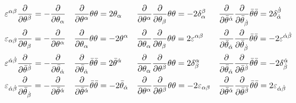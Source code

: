 \documentclass[CheatSheet]{subfiles}
\begin{document}
\begin{align*}
&
\varepsilon^{\alpha\beta}\frac{\partial}{\partial\theta^\beta}=-\frac{\partial}{\partial\theta_\alpha}
&&
\frac{\partial}{\partial \theta^{\alpha}}\theta \theta =2 \theta_{\alpha}
&&
\frac{\partial}{\partial \theta^{\alpha}}\frac{\partial}{\partial \theta_{\beta}}\theta \theta =-2 \delta^{\beta}_{\alpha}
&&
\frac{\partial}{\partial \bar\theta^{{\dot\alpha}}}\frac{\partial}{\partial \bar\theta_{{\dot\beta}}}\bar\theta\bar\theta=2 \delta^{{\dot\beta}}_{{\dot\alpha}}
\\&
\varepsilon_{\alpha\beta}\frac{\partial}{\partial\theta_\beta}=-\frac{\partial}{\partial\theta^\alpha}
&&
\frac{\partial}{\partial \theta_{\alpha}}\theta \theta =-2 \theta^{\alpha}
&&
\frac{\partial}{\partial \theta_{\alpha}}\frac{\partial}{\partial \theta_{\beta}}\theta \theta =2 \varepsilon^{\alpha \beta}
&&
\frac{\partial}{\partial \bar\theta_{{\dot\alpha}}}\frac{\partial}{\partial \bar\theta_{{\dot\beta}}}\bar\theta\bar\theta=-2 \varepsilon^{{\dot\alpha}{\dot\beta}}
\\&
\varepsilon^{{\dot\alpha}{\dot\beta}}\frac{\partial}{\partial\bar\theta^{\dot\beta}}=-\frac{\partial}{\partial\bar\theta_{\dot\alpha}}
&&
\frac{\partial}{\partial \bar\theta_{{\dot\alpha}}}\bar\theta\bar\theta=2 \bar\theta^{{\dot\alpha}}
&&
\frac{\partial}{\partial \theta_{\alpha}}\frac{\partial}{\partial \theta^{\beta}}\theta \theta =2 \delta^{\alpha}_{\beta}
&&
\frac{\partial}{\partial \bar\theta_{{\dot\alpha}}}\frac{\partial}{\partial \bar\theta^{{\dot\beta}}}\bar\theta\bar\theta=-2 \delta^{{\dot\alpha}}_{{\dot\beta}}
\\&
\varepsilon_{{\dot\alpha}{\dot\beta}}\frac{\partial}{\partial\bar\theta_{\dot\beta}}=-\frac{\partial}{\partial\bar\theta^{\dot\alpha}}
&&
\frac{\partial}{\partial \bar\theta^{{\dot\alpha}}}\bar\theta\bar\theta=-2 \bar\theta_{{\dot\alpha}}
&&
\frac{\partial}{\partial \theta^{\alpha}}\frac{\partial}{\partial \theta^{\beta}}\theta \theta =-2 \varepsilon_{\alpha \beta}
&&
\frac{\partial}{\partial \bar\theta^{{\dot\alpha}}}\frac{\partial}{\partial \bar\theta^{{\dot\beta}}}\bar\theta\bar\theta=2 \varepsilon_{{\dot\alpha}{\dot\beta}}
\end{align*}
\end{document}
